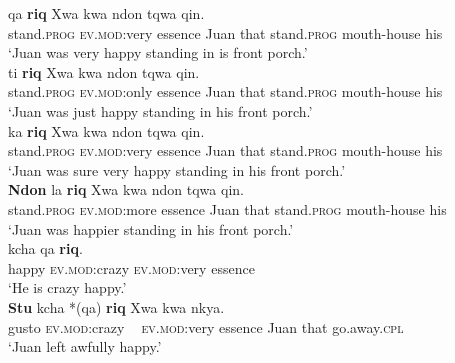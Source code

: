\documentclass[output=paper]{langsci/langscibook}
\begin{document}
\begin{exe}
	\ex\label{ex:CruzStump:28}
	 {{qa}} {\textbf{{riq}} } {{Xwa}} {{ kwa}} {{ndon}} {{tqwa}} {{qin}.}\\
	 {stand.\textsc{prog}} {\textsc{ev.mod}:very} {essence} {Juan} {that} {stand.\textsc{prog}} {mouth-house } {his}\\
	\glt `Juan was very happy standing in is front porch.'\\



	\ex\label{ex:CruzStump:29}
	 {{ti}} {\textbf{{riq}}} {{Xwa}} {{ kwa}} {{ndon}} {{tqwa}} {{qin}.}\\
	 {stand.\textsc{prog}} {\textsc{ev.mod}:only} {essence} {Juan} {that} {stand.\textsc{prog}} {mouth-house } {his}\\
	\glt `Juan was just happy standing in his front porch.'\\



	\ex\label{ex:CruzStump:30}
	 {{ka}} {\textbf{{riq}}} {{Xwa}} {{ kwa}} {{ndon}} {{ tqwa}} {{qin}.}\\
	 {stand.\textsc{prog}} {\textsc{ev.mod}:very} {essence} {Juan} {that} {stand.\textsc{prog}} {mouth-house } {his}\\
	\glt `Juan was sure very happy standing in his front porch.'\\



	\ex\label{ex:CruzStump:31}
	\gll
	 {\textbf{{Ndon}} } {{la}} {\textbf{{riq}}} {{Xwa}} {{kwa}} {{ndon}} {{tqwa} } {{qin}.}\\
	 {stand.\textsc{prog}} {\textsc{ev.mod}:more} {essence} {Juan} {that} {stand.\textsc{prog}} {mouth-house } {his}\\
	\glt `Juan was happier standing in his front porch.'\\



	\ex\label{ex:CruzStump:32}
	 {{kcha} } {{qa}} {\textbf{{riq}}.}\\
	 {happy} {\textsc{ev.mod}:crazy} {\textsc{ev.mod}:very} {essence}\\
	\glt `He is crazy happy.'\\


	\ex\label{ex:CruzStump:33}
	\gll
	\small
	 {\textbf{{Stu}} } {{kcha} } {*{(qa})} {\textbf{{riq}} } {{Xwa} } {{kwa} } {{nkya}.}\\
	 {gusto} {\textsc{ev.mod}:crazy} {\textcolor{white}{*(}\textsc{ev.mod}:very} {essence} {Juan} {that} {go.away.\textsc{cpl}}\\
	\glt `Juan left awfully happy.'\\

\end{exe}
\end{document}
